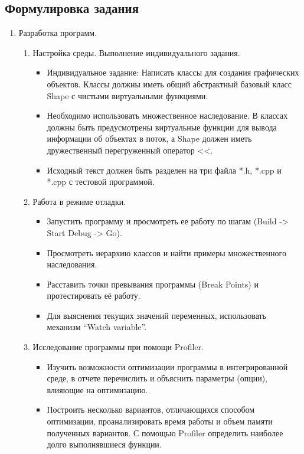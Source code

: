 \documentclass[a4paper, 14pt]{extarticle}
\begin{document}
\subsection{Формулировка задания}
\begin{enumerate}
    \item Разработка программ.
    \begin{enumerate}
        \item Настройка среды. Выполнение индивидуального задания.
        \begin{itemize}
            \item Индивидуальное задание: Написать классы для создания графических объектов. Классы должны иметь общий абстрактный базовый класс Shape с чистыми виртуальными функциями.
            \item Необходимо использовать множественное наследование. В классах должны быть предусмотрены виртуальные функции для вывода информации об объектах в поток, а Shape должен иметь дружественный перегруженный оператор <<.
            \item Исходный текст должен быть разделен на три файла *.h, *.cpp и *.cpp с тестовой программой.
        \end{itemize}
        \item Работа в режиме отладки.
        \begin{itemize}
            \item Запустить программу и просмотреть ее работу по шагам (Build -> Start Debug -> Go).
            \item Просмотреть иерархию классов и найти примеры множественного наследования.
            \item Расставить точки превывания программы (Break Points) и протестировать её работу.
            \item Для выяснения текущих значений переменных, использовать механизм ``Watch variable''.
        \end{itemize}
        \item Исследование программы при помощи Profiler.
        \begin{itemize}
            \item Изучить возможности оптимизации программы в интегрированной среде, в отчете перечислить и объяснить параметры (опции), влияющие на оптимизацию.
            \item Построить несколько вариантов, отличающихся способом оптимизации, проанализировать время работы и объем памяти полученных вариантов. С помощью Profiler определить наиболее долго выполнявшиеся функции.

\end{itemize}
\end{enumerate}
\end{enumerate}
\end{document}
